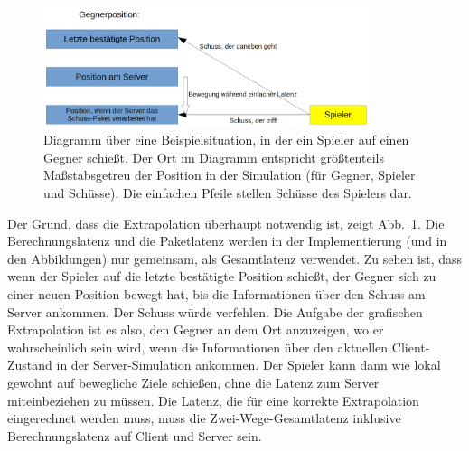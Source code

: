 
\begin{figure}
    \centering
    \includegraphics[width=0.85\textwidth]{./Gegnerposition1a.png}
    \caption{Diagramm über eine Beispielsituation, in der ein Spieler auf einen Gegner schießt. Der Ort im Diagramm entspricht größtenteils Maßstabsgetreu der Position in der Simulation (für Gegner, Spieler und Schüsse). Die einfachen Pfeile stellen Schüsse des Spielers dar.}
    \label{fig:gegnerposition1a}
\end{figure}

Der Grund, dass die Extrapolation überhaupt notwendig ist, zeigt Abb.~\ref{fig:gegnerposition1a}. Die Berechnungslatenz und die Paketlatenz werden in der Implementierung (und in den Abbildungen) nur gemeinsam, als Gesamtlatenz verwendet. Zu sehen ist, dass wenn der Spieler auf die letzte bestätigte Position schießt, der Gegner sich zu einer neuen Position bewegt hat, bis die Informationen über den Schuss am Server ankommen. Der Schuss würde verfehlen. Die Aufgabe der grafischen Extrapolation ist es also, den Gegner an dem Ort anzuzeigen, wo er wahrscheinlich sein wird, wenn die Informationen über den aktuellen Client-Zustand in der Server-Simulation ankommen. Der Spieler kann dann wie lokal gewohnt auf bewegliche Ziele schießen, ohne die Latenz zum Server miteinbeziehen zu müssen.
Die Latenz, die für eine korrekte Extrapolation eingerechnet werden muss, muss die Zwei-Wege-Gesamtlatenz inklusive Berechnungslatenz auf Client und Server sein.\\


